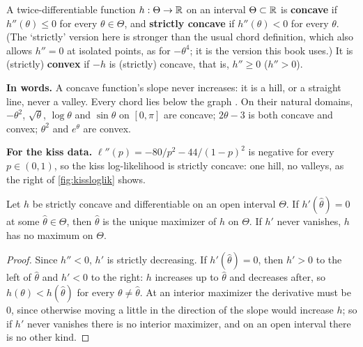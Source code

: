 \begin{definition}
\label{def:concave}
A twice-differentiable function $h: \Theta \to \mathbb{R}$ on an interval $\Theta \subset \mathbb{R}$ is \textbf{concave} if $h''(\theta) \leq 0$ for every $\theta \in \Theta$, and \textbf{strictly concave} if $h''(\theta) < 0$ for every $\theta$.
(The `strictly' version here is stronger than the usual chord definition, which also allows $h'' = 0$ at isolated points, as for $-\theta^4$; it is the version this book uses.)
It is (strictly) \textbf{convex} if $-h$ is (strictly) concave, that is, $h'' \geq 0$ ($h'' > 0$).
\end{definition}

\begin{inwords}
\textbf{In words.} A concave function's slope never increases: it is a hill, or a straight line, never a valley. Every chord lies below the graph . On their natural domains, $-\theta^2$, $\sqrt{\theta}$, $\log\theta$ and $\sin\theta$ on $[0, \pi]$ are concave; $2\theta - 3$ is both concave and convex; $\theta^2$ and $e^\theta$ are convex.
\par\smallskip
\textbf{For the kiss data.} $\ell''(p) = -80/p^2 - 44/(1 - p)^2$ is negative for every $p \in (0, 1)$, so the kiss log-likelihood is strictly concave: one hill, no valleys, as the right of \cref{fig:kissloglik} shows.
\end{inwords}

\begin{proposition}
\label{prop:concave-max}
Let $h$ be strictly concave and differentiable on an open interval $\Theta$.
If $h'(\hat{\theta}) = 0$ at some $\hat{\theta} \in \Theta$, then $\hat{\theta}$ is the unique maximizer of $h$ on $\Theta$.
If $h'$ never vanishes, $h$ has no maximum on $\Theta$.
\end{proposition}

\begin{proof}
Since $h'' < 0$, $h'$ is strictly decreasing.
If $h'(\hat{\theta}) = 0$, then $h' > 0$ to the left of $\hat{\theta}$ and $h' < 0$ to the right: $h$ increases up to $\hat{\theta}$ and decreases after, so $h(\theta) < h(\hat{\theta})$ for every $\theta \neq \hat{\theta}$.
At an interior maximizer the derivative must be $0$, since otherwise moving a little in the direction of the slope would increase $h$; so if $h'$ never vanishes there is no interior maximizer, and on an open interval there is no other kind.
\end{proof}

